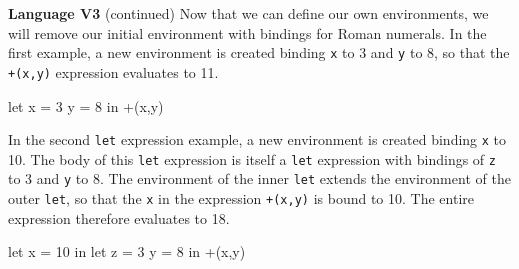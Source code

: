 \begin{minipage}[t]{\sw}
\slidenumber
\LARGE
{\bf Language V3} (continued)\exx
Now that we can define our own environments,
we will remove our initial environment with bindings
for Roman numerals.\exx
In the first example, a new environment is created
binding \verb'x' to 3 and \verb'y' to 8,
so that the \verb'+(x,y)' expression evaluates to 11.
{\Large
\begin{qv}
let x = 3 y = 8
in +(x,y)
\end{qv}
}
In the second \verb'let' expression example,
a new environment is created
binding \verb'x' to 10.
The body of this \verb'let' expression
is itself a \verb'let' expression
with bindings of \verb'z' to 3 and \verb'y' to 8.
The environment of the inner \verb'let'
extends the environment of the outer \verb'let',
so that the \verb'x' in the expression \verb'+(x,y)' is bound to 10.
The entire expression therefore evaluates to 18.
{\Large
\begin{qv}
let x = 10
in
  let z = 3 y = 8
  in +(x,y)
\end{qv}
}
\end{minipage}
\clearpage
